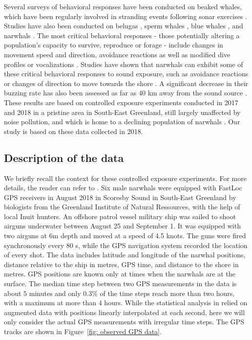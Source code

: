 \documentclass[aoas]{imsart}
\theoremstyle{definition}
\theoremstyle{remark}
\theoremstyle{remark}
\newcommand {\1}{\mathbb{1}}
\begin{document}
Several surveys of behavioral responses have been conducted on beaked whales, which have been regularly involved in stranding events following sonar exercises \citep{tyack_beaked_2011,cioffi_trade-offs_2022}. Studies have also been conducted on belugas \citep{martin_exposure_2023}, sperm whales \citep{madsen_quantitative_2006}, blue whales \citep{friedlaender_preymediated_2016}, and narwhals \citep{heide-jorgensen_behavioral_2021, tervo_narwhals_2021, tervo_stuck_2023}.
The most critical behavioral responses - those potentially altering a population's capacity to survive, reproduce or forage - include changes in movement speed and direction, avoidance reactions as well as modified dive profiles or vocalizations \citep{southall_marine_2008}.
Studies have shown that narwhals can exhibit some of these critical behavioral responses to sound exposure, such as avoidance reactions or changes of direction to move towards the shore \citep{heide-jorgensen_behavioral_2021}. A significant decrease in their buzzing rate has also been assessed as far as 40 km away from the sound source \citep{tervo_narwhals_2021}. These results are based on controlled exposure experiments conducted in 2017 and 2018 in a pristine area in South-East Greenland, still largely unaffected by noise pollution, and which is home to a declining population of narwhals \citep{garde_biological_2022}. Our study is based on these data collected in 2018.
 \\


\subsection{Description of the data}
We briefly recall the context for these controlled exposure experiments. For more details, the reader can refer to \cite{heide-jorgensen_behavioral_2021}. Six male narwhals were equipped with FastLoc GPS receivers in August 2018 in Scoresby Sound in South-East Greenland by biologists from the Greenland Institute of Natural Ressources, with the help of local Inuit hunters. 
An offshore patrol vessel military ship was sailed to shoot airguns underwater between August 25 and September 1. It was equipped with two airguns at 6m depth and moved at a speed of 4.5 knots. The guns were fired synchronously every $80$ s, while the GPS navigation system recorded the location of every shot. 
The data includes latitude and longitude of the narwhal positions, distance relative to the ship in metres, GPS time, and distance to the shore in metres. GPS positions are known only at times when the narwhals are at the surface. The median time step between two GPS measurements in the data is about $5$ minutes and only $0.3 \%$ of the time steps reach more than two hours, with a maximum at more than $4$ hours. While the statistical analysis in \citep{heide-jorgensen_behavioral_2021} relied on augmented data with positions linearly interpolated at each second, here we will only consider the actual GPS measurements with irregular time steps. The GPS tracks are shown in Figure~\ref{fig: observed GPS data}.\\
\end{document}
